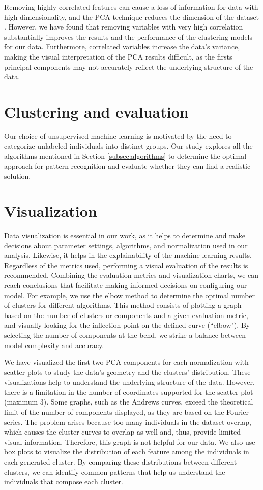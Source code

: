 Removing highly correlated features can cause a loss of information for data with high dimensionality, and the PCA technique reduces the dimension of the dataset \cite{frost2017multicollinearity}. However, we have found that removing variables with very high correlation substantially improves the results and the performance of the clustering models for our data. Furthermore, correlated variables increase the data's variance, making the visual interpretation of the PCA results difficult, as the firsts principal components may not accurately reflect the underlying structure of the data.

\section{Clustering and evaluation}

Our choice of unsupervised machine learning is motivated by the need to categorize unlabeled individuals into distinct groups. Our study explores all the algorithms mentioned in Section \ref{subsec:algorithms} to determine the optimal approach for pattern recognition and evaluate whether they can find a realistic solution.

\section{Visualization} 

Data visualization is essential in our work, as it helps to determine and make decisions about parameter settings, algorithms, and normalization used in our analysis. Likewise, it helps in the explainability of the machine learning results. Regardless of the metrics used, performing a visual evaluation of the results is recommended. Combining the evaluation metrics and visualization charts, we can reach conclusions that facilitate making informed decisions on configuring our model. For example, we use the elbow method to determine the optimal number of clusters for different algorithms. This method consists of plotting a graph based on the number of clusters or components and a given evaluation metric, and visually looking for the inflection point on the defined curve (``elbow"). By selecting the number of components at the bend, we strike a balance between model complexity and accuracy. 

We have visualized the first two PCA components for each normalization with scatter plots to study the data's geometry and the clusters' distribution. These visualizations help to understand the underlying structure of the data. However, there is a limitation in the number of coordinates supported for the scatter plot (maximum 3). Some graphs, such as the Andrews curves, exceed the theoretical limit of the number of components displayed, as they are based on the Fourier series. The problem arises because too many individuals in the dataset overlap, which causes the cluster curves to overlap as well and, thus, provide limited visual information. Therefore, this graph is not helpful for our data. We also use box plots to visualize the distribution of each feature among the individuals in each generated cluster. By comparing these distributions between different clusters, we can identify common patterns that help us understand the individuals that compose each cluster.